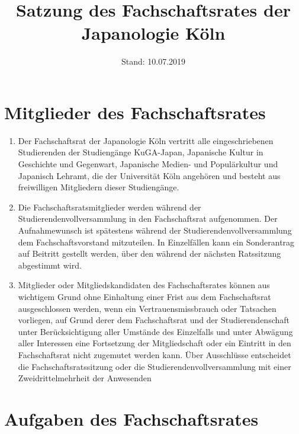 \documentclass[12pt]{scrartcl}
\title{Satzung des Fachschaftsrates der Japanologie Köln}
\date{Stand: 10.07.2019}
\begin{document}
\maketitle

\section{Mitglieder des Fachschaftsrates}

\begin{enumerate}
	\item Der Fachschaftsrat der Japanologie Köln vertritt alle eingeschriebenen Studierenden der Studiengänge KuGA-Japan, Japanische Kultur in Geschichte und Gegenwart, Japanische Medien- und Populärkultur und Japanisch Lehramt, die der Universität Köln angehören und besteht aus freiwilligen Mitgliedern dieser Studiengänge.
	\item Die Fachschaftsratsmitglieder werden während der Studierendenvollversammlung in den Fachschaftsrat aufgenommen. Der Aufnahmewunsch ist spätestens während der Studierendenvollversammlung dem Fachschaftsvorstand mitzuteilen. In Einzelfällen kann ein Sonderantrag auf Beitritt gestellt werden, über den während der nächsten Ratssitzung abgestimmt wird.
	\item Mitglieder oder Mitgliedskandidaten des Fachschaftsrates können aus wichtigem Grund ohne Einhaltung einer Frist aus dem Fachschaftsrat ausgeschlossen werden, wenn ein Vertrauensmissbrauch oder Tatsachen vorliegen, auf Grund derer dem Fachschaftsrat und der Studierendenschaft unter Berücksichtigung aller Umstände des Einzelfalls und unter Abwägung aller Interessen eine Fortsetzung der Mitgliedschaft oder ein Eintritt in den Fachschaftsrat nicht zugemutet werden kann. Über Ausschlüsse entscheidet die Fachschaftsratssitzung oder die Studierendenvollversammlung mit einer Zweidrittelmehrheit der Anwesenden
\end{enumerate}

\section{Aufgaben des Fachschaftsrates}
\label{sec:aufgaben}
\end{document}
